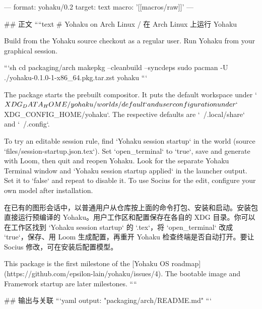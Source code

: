 ---
format: yohaku/0.2
target: text
macro: '[[macros/raw]]'
---

## 正文
````text
# Yohaku on Arch Linux / 在 Arch Linux 上运行 Yohaku

Build from the Yohaku source checkout as a regular user. Run Yohaku from your graphical session.

```sh
cd packaging/arch
makepkg --cleanbuild --syncdeps
sudo pacman -U ./yohaku-0.1.0-1-x86_64.pkg.tar.zst
yohaku
```

The package starts the prebuilt compositor. It puts the default workspace under `$XDG_DATA_HOME/yohaku/worlds/default` and user configuration under `$XDG_CONFIG_HOME/yohaku`. The respective defaults are `~/.local/share` and `~/.config`.

To try an editable session rule, find `Yohaku session startup` in the world (source `files/session-startup.json.tex`). Set `open_terminal` to `true`, save and generate with Loom, then quit and reopen Yohaku. Look for the separate Yohaku Terminal window and `Yohaku session startup applied` in the launcher output. Set it to `false` and repeat to disable it. To use Socius for the edit, configure your own model after installation.

在已有的图形会话中，以普通用户从仓库按上面的命令打包、安装和启动。安装包直接运行预编译的 Yohaku。用户工作区和配置保存在各自的 XDG 目录。你可以在工作区找到 `Yohaku session startup` 的 `.tex`，将 `open_terminal` 改成 `true`，保存、用 Loom 生成配置，再重开 Yohaku 检查终端是否自动打开。要让 Socius 修改，可在安装后配置模型。

This package is the first milestone of the [Yohaku OS roadmap](https://github.com/epsilon-lain/yohaku/issues/4). The bootable image and Framework startup are later milestones.
````

## 输出与关联
```yaml
output: "packaging/arch/README.md"
```
